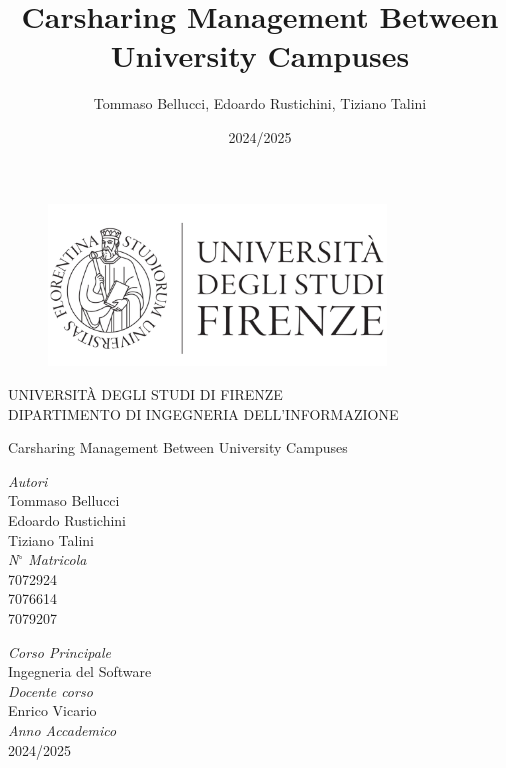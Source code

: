 \documentclass{article}
\title{\textbf{Carsharing Management Between University Campuses}}
\author{Tommaso Bellucci, Edoardo Rustichini, Tiziano Talini}
\date{2024/2025}
\begin{document}
\begin{titlepage}
    \begin{figure}[h]
            \centering  
            \includegraphics[width=0.8\textwidth]{Images/Unifi logo.png}
    \end{figure}

    \begin{center}
        \large{UNIVERSITÀ DEGLI STUDI DI FIRENZE}
        \vspace{1mm}\\
        \large{DIPARTIMENTO DI INGEGNERIA DELL'INFORMAZIONE}
    \end{center}

    \vspace{10mm}
    \begin{center}
        \LARGE{Carsharing Management Between University Campuses}
    \end{center}
    \vspace{10mm}

    \begin{minipage}[t]{0.45\textwidth}
        \textit{Autori}\vspace{2mm}\\ Tommaso Bellucci \vspace{1mm}\\ Edoardo Rustichini \vspace{1mm} \\Tiziano Talini \vspace{3mm}\\
        \textit{N$^{\circ}$ Matricola} \vspace{2mm}\\
        7072924 \vspace{1mm} \\ 7076614 \vspace{1mm} \\ 7079207
    \end{minipage}
    \begin{minipage}[t]{0.45\textwidth}\raggedleft
        \textit{Corso Principale} \vspace{2mm}\\
        Ingegneria del Software \vspace{3mm}\\
        \textit{Docente corso} \vspace{2mm}\\
        Enrico Vicario \vspace{3mm}\\
        \textit{Anno Accademico} \vspace{2mm}\\
        2024/2025
    \end{minipage}
\end{titlepage}
\newpage
\tableofcontents
\newpage









\end{document}
